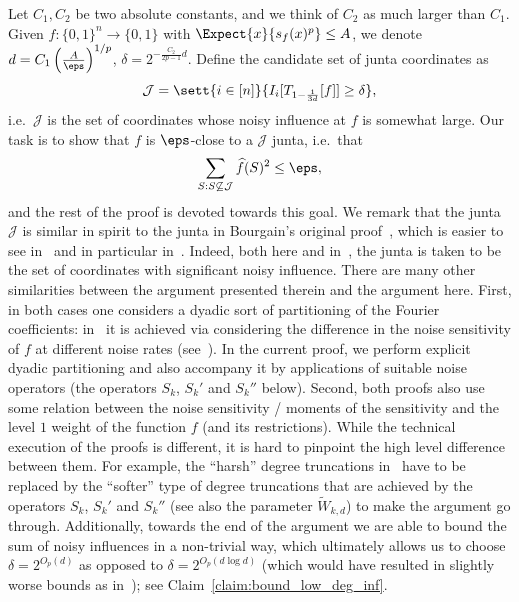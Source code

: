 Let $C_1, C_2$ be two absolute constants, and we think of $C_2$ as much larger than $C_1$. Given $f\colon\{0,1\}^n\to\{0,1\}$ with
$\Expect{x}{s_f(x)^p}\leq A$, we denote $d = C_1\left(\frac{A}{\eps}\right)^{1/p}$, $\delta = 2^{-\frac{C_2}{2p-1} d}$.
Define the candidate set of junta coordinates as
\[
\mathcal{J} = \sett{i\in [n]}{I_i[T_{1-\frac{1}{3d}}[f]]\geq \delta},
\]
i.e.~$\mathcal{J}$ is the set of coordinates whose noisy influence at $f$ is somewhat large. Our task is to show that $f$ is $\eps$-close to a $\mathcal{J}$ junta,
i.e.~that
\begin{equation}\label{eq6}
\sum\limits_{S: S\not\subseteq \mathcal{J}}\widehat{f}(S)^2\leq \eps,
\end{equation}
and the rest of the proof is devoted towards this goal. We remark that the junta $\mathcal{J}$ is
similar in spirit to the junta in Bourgain’s original proof~\cite{Bourgain}, which is easier to see in~\cite[Section 4]{kindler2018gaussian} and
in particular in~\cite[Theorem 4.20]{kindler2018gaussian}. Indeed, both here and in~\cite[Section 4]{kindler2018gaussian}, the junta is
taken to be the set of coordinates with significant noisy influence. There are many other similarities between the argument
presented therein and the argument here. First, in both cases one considers a dyadic sort of partitioning of the Fourier coefficients:
in~\cite[Section 4]{kindler2018gaussian} it is achieved via considering the difference in the noise sensitivity of $f$ at different
noise rates (see~\cite[Theorem 4.16]{kindler2018gaussian}). In the current proof, we perform explicit dyadic partitioning and also
accompany it by applications of suitable noise operators (the operators $S_k$, $S_k'$ and $S_k''$ below). Second, both proofs also use some relation between the noise sensitivity / moments
of the sensitivity and the level $1$ weight of the function $f$ (and its restrictions). While the technical execution of the proofs is
different, it is hard to pinpoint the high level difference between them.
For example, the ``harsh'' degree truncations
in~\cite{kindler2018gaussian} have to be replaced by the ``softer'' type of degree truncations that are achieved by the operators $S_k$, $S_k'$ and
$S_k''$ (see also the parameter $\tilde{W}_{k,d}$) to make the argument go through. Additionally, towards the end of the argument we are able to bound the sum of noisy influences in a non-trivial way, which ultimately allows us to choose $\delta = 2^{O_p(d)}$ as opposed to
$\delta = 2^{O_{p}(d\log d)}$ (which would have resulted in slightly worse bounds as in~\cite[Theorem 4.20]{kindler2018gaussian}); see Claim~\ref{claim:bound_low_deg_inf}.


